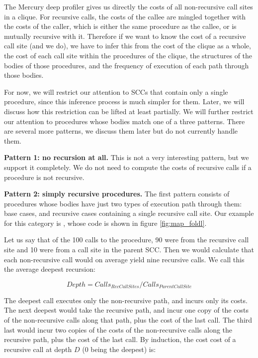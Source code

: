 The Mercury deep profiler gives us directly
the costs of all non-recursive call sites in a clique.
For recursive calls,
the costs of the callee are mingled together
with the costs of the caller,
which is either the same procedure as the callee,
or is mutually recursive with it.
Therefore if we want to know the cost of a recursive call site (and we do),
we have to infer this
from the cost of the clique as a whole,
the cost of each call site within the procedures of the clique,
the structures of the bodies of those procedures,
and the frequency of execution of each path through those bodies.

For now, we will restrict our attention to SCCs
that contain only a single procedure,
since this inference process is much simpler for them.
Later, we will discuss how this restriction can be lifted at least partially.
We will further restrict our attention to procedures
whose bodies match one of a three patterns.
There are several more patterns, we discuss them later but do not currently
handle them.

{\bf Pattern 1: no recursion at all.}
This is not a very interesting pattern, but we support it completely.
We do not need to compute the costs of recursive calls if a procedure is not
recursive.

{\bf Pattern 2: simply recursive procedures.}
The first pattern consists of procedures whose bodies
have just two types of execution path through them:
base cases, and recursive cases containing a single recursive call site.
Our example for this category is ,
whose code is shown in figure \ref{fig:map_foldl}.

Let us say that of the 100 calls to the procedure,
90 were from the recursive call site
and 10 were from a call site in the parent SCC.
Then we would calculate
that each non-recursive call
would on average yield nine recursive calls.
We call this the average deepest recursion:

\begin{equation*}
Depth = Calls_{RecCallSites} / Calls_{ParentCallSite}
\end{equation*}

The deepest call executes only the non-recursive path,
and incurs only its costs.
The next deepest would take the recursive path,
and incur one copy of the costs of the non-recursive calls along that path,
plus the cost of the last call.
The third last would incur two copies of the costs
of the non-recursive calls along the recursive path,
plus the cost of the last call.
By induction,
the cost cost of a recursive call at depth $D$ (0 being the deepest)
is:

